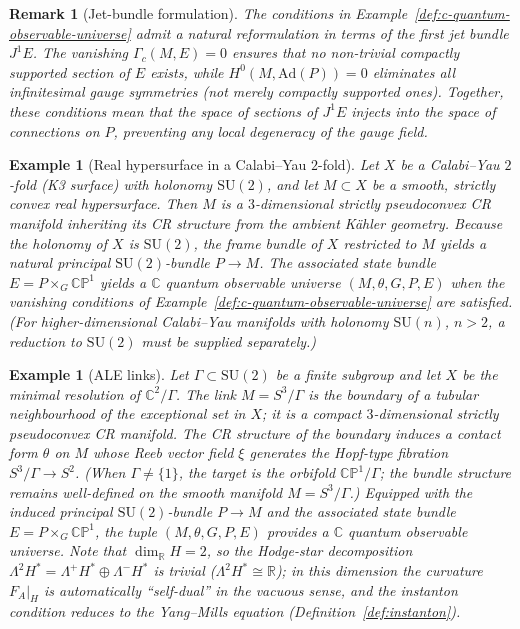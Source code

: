 \documentclass[12pt,a4paper]{report}
\newtheorem{example}[theorem]{Example}
\newtheorem{remark}[theorem]{Remark}
\begin{document}
\begin{remark}[Jet-bundle formulation]
\label{rem:jet-bundle}
The conditions in Example~\ref{def:c-quantum-observable-universe} admit a
natural reformulation in terms of the first jet bundle $J^1 E$.  The vanishing
$\Gamma_c(M, E) = 0$ ensures that no non-trivial compactly supported section of
$E$ exists, while $H^0(M, \mathrm{Ad}(P)) = 0$ eliminates \emph{all}
infinitesimal gauge symmetries (not merely compactly supported ones).  Together,
these conditions mean that the space of sections of $J^1 E$ injects into the
space of connections on $P$, preventing any local degeneracy of the gauge field.
\end{remark}

\begin{example}[Real hypersurface in a Calabi--Yau $2$-fold]
\label{ex:calabi-yau}
Let $X$ be a Calabi--Yau $2$-fold (K3 surface) with holonomy
$\mathrm{SU}(2)$, and let $M \subset X$ be a smooth, strictly convex real
hypersurface.  Then $M$ is a $3$-dimensional strictly pseudoconvex CR
manifold inheriting its CR structure from the ambient K\"ahler geometry.
Because the holonomy of $X$ is $\mathrm{SU}(2)$, the frame bundle of $X$
restricted to $M$ yields a natural principal $\mathrm{SU}(2)$-bundle
$P \to M$.  The associated state bundle $E = P \times_G \mathbb{CP}^1$
yields a $\mathbb{C}$ quantum observable universe $(M, \theta, G, P, E)$
when the vanishing conditions of
Example~\ref{def:c-quantum-observable-universe} are satisfied.  (For
higher-dimensional Calabi--Yau manifolds with holonomy $\mathrm{SU}(n)$,
$n > 2$, a reduction to $\mathrm{SU}(2)$ must be supplied separately.)
\end{example}

\begin{example}[ALE links]
\label{ex:ale}
Let $\Gamma \subset \mathrm{SU}(2)$ be a finite subgroup and let $X$ be the
minimal resolution of $\mathbb{C}^2 / \Gamma$.  The link
$M = S^3 / \Gamma$ is the boundary of a tubular neighbourhood of the
exceptional set in $X$; it is a compact $3$-dimensional strictly pseudoconvex
CR manifold.  The CR structure of the boundary induces a contact form
$\theta$ on $M$ whose Reeb vector field $\xi$ generates the Hopf-type
fibration $S^3/\Gamma \to S^2$.  (When $\Gamma \neq \{1\}$, the target is
the orbifold $\mathbb{CP}^1/\Gamma$; the bundle structure remains
well-defined on the smooth manifold $M = S^3/\Gamma$.)  Equipped with the
induced principal $\mathrm{SU}(2)$-bundle $P \to M$ and the associated
state bundle $E = P \times_G \mathbb{CP}^1$, the tuple
$(M, \theta, G, P, E)$ provides a $\mathbb{C}$ quantum observable universe.
Note that $\dim_{\mathbb{R}} H = 2$, so the Hodge-star decomposition
$\Lambda^2 H^* = \Lambda^+\! H^* \oplus \Lambda^-\! H^*$ is trivial
($\Lambda^2 H^* \cong \mathbb{R}$); in this dimension the curvature
$F_A|_H$ is automatically ``self-dual'' in the vacuous sense, and the
instanton condition reduces to the Yang--Mills equation
(Definition~\ref{def:instanton}).
\end{example}
\end{document}
